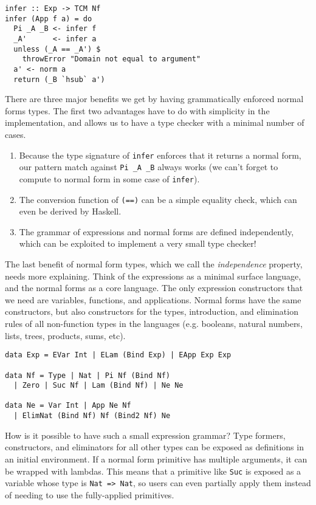 \documentclass[preprint,authoryear]{sigplanconf}
\begin{document}
\begin{verbatim}
infer :: Exp -> TCM Nf
infer (App f a) = do
  Pi _A _B <- infer f
  _A'      <- infer a
  unless (_A == _A') $
    throwError "Domain not equal to argument"
  a' <- norm a
  return (_B `hsub` a')
\end{verbatim}

There are three major benefits we get by having grammatically enforced
normal forms types. The first two advantages have to do with
simplicity in the implementation, and allows us to have a type checker
with a minimal number of cases.

\begin{enumerate}
\item Because the type signature of \texttt{infer} enforces that it
  returns a normal form, our pattern match against \texttt{Pi \_A \_B}
  always works (we can't forget to compute to normal form in some case
  of \texttt{infer}).
\item The conversion function of \texttt{(==)} can be a simple
  equality check, which can even be derived by Haskell.
\item The grammar of expressions and normal forms are defined
  independently, which can be exploited to implement a very small type
  checker!
\end{enumerate}

The last benefit of normal form types, which we call the
 {\it independence} property, needs more explaining. Think of
the expressions as a minimal surface language, and the
normal forms as a core language. The only expression constructors that we
need are variables, functions, and applications. Normal forms have the
same constructors, but also constructors for the types, introduction,
and elimination rules of all non-function types in the languages (e.g.
booleans, natural numbers, lists, trees, products, sums, etc).

\begin{verbatim}
data Exp = EVar Int | ELam (Bind Exp) | EApp Exp Exp

data Nf = Type | Nat | Pi Nf (Bind Nf)
  | Zero | Suc Nf | Lam (Bind Nf) | Ne Ne

data Ne = Var Int | App Ne Nf
  | ElimNat (Bind Nf) Nf (Bind2 Nf) Ne
\end{verbatim}

How is it possible to have such a small expression grammar? Type
formers, constructors, and eliminators for all other types can be
exposed as definitions in an initial environment. If a normal form
primitive has multiple arguments, it can be wrapped with lambdas. This
means that a primitive like \texttt{Suc} is exposed as a variable
whose type is \texttt{Nat => Nat}, so users can even partially apply
them instead of needing to use the fully-applied primitives. 
\end{document}
